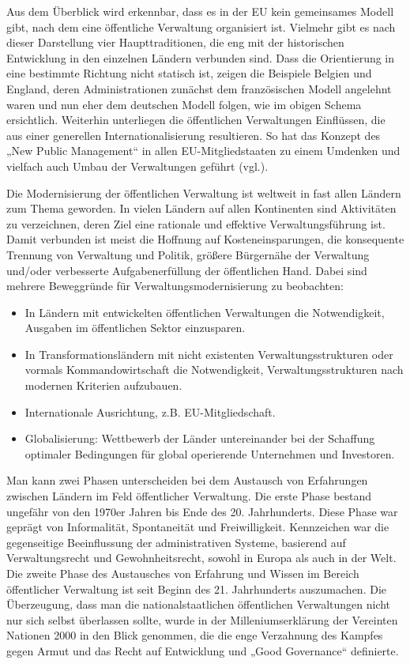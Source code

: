 Aus dem Überblick wird erkennbar, dass es in der EU kein gemeinsames Modell gibt, nach dem eine öffentliche Verwaltung organisiert ist. Vielmehr gibt es nach dieser Darstellung vier Haupttraditionen, die eng mit der historischen Entwicklung in den einzelnen Ländern verbunden sind. Dass die Orientierung in eine bestimmte Richtung nicht statisch ist, zeigen die Beispiele Belgien und England, deren Administrationen zunächst dem französischen Modell angelehnt waren und nun eher dem deutschen Modell folgen, wie im obigen Schema ersichtlich. Weiterhin unterliegen die öffentlichen Verwaltungen Einflüssen, die aus einer generellen Internationalisierung resultieren. So hat das Konzept des „New Public Management“ in allen EU-Mitgliedstaaten zu einem Umdenken und vielfach auch Umbau der Verwaltungen geführt (vgl.\cite{dunhoo}).
\par
Die Modernisierung der öffentlichen Verwaltung ist weltweit in fast allen Ländern zum Thema geworden. In vielen Ländern auf allen Kontinenten sind Aktivitäten zu verzeichnen, deren Ziel eine rationale und effektive Verwaltungsführung ist. Damit verbunden ist meist die Hoffnung auf Kosteneinsparungen, die konsequente Trennung von Verwaltung und Politik, größere Bürgernähe der Verwaltung und/oder verbesserte Aufgabenerfüllung der öffentlichen Hand. Dabei sind mehrere Beweggründe für Verwaltungsmodernisierung zu beobachten:
\par
\begin{itemize}
\item In Ländern mit entwickelten öffentlichen Verwaltungen die Notwendigkeit, Ausgaben im öffentlichen Sektor einzusparen.
\item In Transformationsländern mit nicht existenten Verwaltungsstrukturen oder vormals Kommandowirtschaft die Notwendigkeit, Verwaltungsstrukturen nach modernen Kriterien aufzubauen.
\item Internationale Ausrichtung, z.B. EU-Mitgliedschaft.
\item Globalisierung: Wettbewerb der Länder untereinander bei der Schaffung optimaler Bedingungen für global operierende Unternehmen und Investoren.
\end{itemize}
Man kann zwei Phasen unterscheiden bei dem Austausch von Erfahrungen zwischen Ländern im Feld öffentlicher Verwaltung. Die erste Phase bestand ungefähr von den 1970er Jahren bis Ende des 20. Jahrhunderts. Diese Phase war geprägt von Informalität, Spontaneität und Freiwilligkeit. Kennzeichen war die gegenseitige Beeinflussung der administrativen Systeme, basierend auf Verwaltungsrecht und Gewohnheitsrecht, sowohl in Europa als auch in der Welt. Die zweite Phase des Austausches von Erfahrung und Wissen im Bereich öffentlicher Verwaltung ist seit Beginn des 21. Jahrhunderts auszumachen. Die Überzeugung, dass man die nationalstaatlichen öffentlichen Verwaltungen nicht nur sich selbst überlassen sollte, wurde in der Milleniumserklärung der Vereinten Nationen 2000 in den Blick genommen, die die enge Verzahnung des Kampfes gegen Armut und das Recht auf Entwicklung und „Good Governance“ definierte. 
